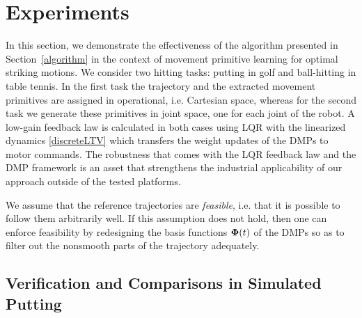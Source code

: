 \section{Experiments}\label{experiments}


In this section, we demonstrate the effectiveness of the algorithm presented in Section~\ref{algorithm} in the context of movement primitive learning for optimal striking motions. We consider two hitting tasks: putting in golf and ball-hitting in table tennis. In the first task the trajectory and the extracted movement primitives are assigned in operational, i.e. Cartesian space, whereas for the second task we generate these primitives in joint space, one for each joint of the robot. A low-gain feedback law is calculated in both cases using LQR with the linearized dynamics \eqref{discreteLTV} which transfers the weight updates of the DMPs to motor commands. The robustness that comes with the LQR feedback law and the DMP framework is an asset that strengthens the industrial applicability of our approach outside of the tested platforms.

We assume that the reference trajectories are \emph{feasible}, i.e. that it is possible to follow them arbitrarily well. If this assumption does not hold, then one can enforce feasibility by redesigning the basis functions $\boldsymbol{\mathrm{\Phi}}(t)$ of the DMPs so as to filter out the nonsmooth parts of the trajectory adequately.

\subsection{Verification and Comparisons in Simulated Putting}



